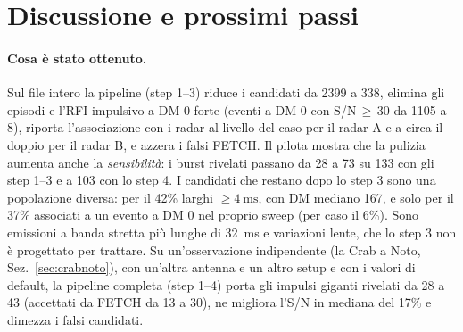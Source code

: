 


\FloatBarrier
\section{Discussione e prossimi passi}
\label{sec:next}

\paragraph{Cosa è stato ottenuto.} Sul file intero la pipeline (step 1--3) riduce i candidati da 2399 a 338, elimina gli
episodi e l'RFI impulsivo a DM 0 forte (eventi a DM 0 con S/N\,$\geq$\,30 da 1105 a 8), riporta l'associazione con i radar
al livello del caso per il radar A e a circa il doppio per il radar B, e azzera i falsi FETCH. Il pilota mostra che la
pulizia aumenta anche la \emph{sensibilità}: i burst rivelati passano da 28 a 73 su 133 con gli step 1--3 e a 103 con lo
step 4. I candidati che restano dopo lo step 3 sono una popolazione diversa: per il 42\% larghi $\geq\SI{4}{\milli\second}$,
con DM mediano 167, e solo per il 37\% associati a un evento a DM 0 nel proprio sweep (per caso il 6\%). Sono emissioni a
banda stretta più lunghe di \SI{32}{\milli\second} e variazioni lente, che lo step 3 non è progettato per trattare.
Su un'osservazione indipendente (la Crab a Noto, Sez.~\ref{sec:crabnoto}), con un'altra antenna e un altro setup e con i
valori di default, la pipeline completa (step 1--4) porta gli impulsi giganti rivelati da 28 a 43 (accettati da FETCH da
13 a 30), ne migliora l'S/N in mediana del 17\% e dimezza i falsi candidati.

